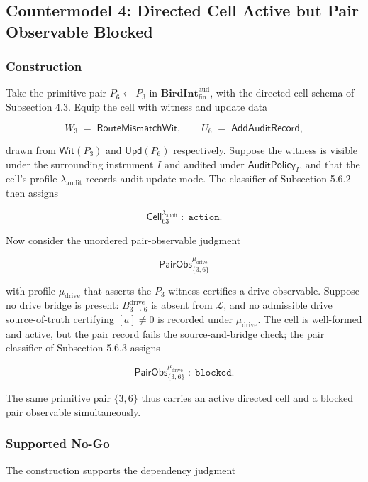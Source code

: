 \documentclass[11pt]{article}
\theoremstyle{definition}
\begin{document}
\subsection{Countermodel 4: Directed Cell Active but Pair Observable Blocked}

\subsubsection{Construction}

Take the primitive pair \(P_6\leftarrow P_3\) in \(\mathbf{BirdInt}^{\mathrm{aud}}_{\mathrm{fin}}\), with the directed-cell schema of Subsection 4.3. Equip the cell with witness and update data

\[
W_3\;=\;\mathsf{RouteMismatchWit},\qquad U_6\;=\;\mathsf{AddAuditRecord},
\]

drawn from \(\mathsf{Wit}(P_3)\) and \(\mathsf{Upd}(P_6)\) respectively. Suppose the witness is visible under the surrounding instrument \(I\) and audited under \(\mathsf{AuditPolicy}_I\), and that the cell's profile \(\lambda_{\mathrm{audit}}\) records audit-update mode. The classifier of Subsection 5.6.2 then assigns

\[
\mathsf{Cell}_{63}^{\lambda_{\mathrm{audit}}}\;:\;\texttt{action}.
\]

Now consider the unordered pair-observable judgment

\[
\mathsf{PairObs}_{\{3,6\}}^{\mu_{\mathrm{drive}}}
\]

with profile \(\mu_{\mathrm{drive}}\) that asserts the \(P_3\)-witness certifies a drive observable. Suppose no drive bridge is present: \(B_{3\to 6}^{\mathrm{drive}}\) is absent from \(\mathcal L\), and no admissible drive source-of-truth certifying \([a]\neq0\) is recorded under \(\mu_{\mathrm{drive}}\). The cell is well-formed and active, but the pair record fails the source-and-bridge check; the pair classifier of Subsection 5.6.3 assigns

\[
\mathsf{PairObs}_{\{3,6\}}^{\mu_{\mathrm{drive}}}\;:\;\texttt{blocked}.
\]

The same primitive pair \(\{3,6\}\) thus carries an active directed cell and a blocked pair observable simultaneously.

\subsubsection{Supported No-Go}

The construction supports the dependency judgment
\end{document}
